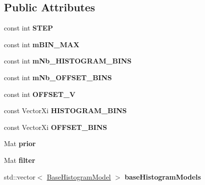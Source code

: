 \subsection*{Public Attributes}
\begin{DoxyCompactItemize}
\item 
\hypertarget{classLaneFilter_ab71c393caf2edf8518576757c5c5c60a}{const int {\bfseries S\-T\-E\-P}}\label{classLaneFilter_ab71c393caf2edf8518576757c5c5c60a}

\item 
\hypertarget{classLaneFilter_a2193e82063749e9aff6f9487d57aaad7}{const int {\bfseries m\-B\-I\-N\-\_\-\-M\-A\-X}}\label{classLaneFilter_a2193e82063749e9aff6f9487d57aaad7}

\item 
\hypertarget{classLaneFilter_a318e84ea645f716c0a66ef83175e8556}{const int {\bfseries m\-Nb\-\_\-\-H\-I\-S\-T\-O\-G\-R\-A\-M\-\_\-\-B\-I\-N\-S}}\label{classLaneFilter_a318e84ea645f716c0a66ef83175e8556}

\item 
\hypertarget{classLaneFilter_a020236f8bcee6881d72a235c111c677f}{const int {\bfseries m\-Nb\-\_\-\-O\-F\-F\-S\-E\-T\-\_\-\-B\-I\-N\-S}}\label{classLaneFilter_a020236f8bcee6881d72a235c111c677f}

\item 
\hypertarget{classLaneFilter_a2dff037db82119c2372d49b5d79ca44e}{const int {\bfseries O\-F\-F\-S\-E\-T\-\_\-\-V}}\label{classLaneFilter_a2dff037db82119c2372d49b5d79ca44e}

\item 
\hypertarget{classLaneFilter_a96434ede64ca9b358416546069ce24b0}{const Vector\-Xi {\bfseries H\-I\-S\-T\-O\-G\-R\-A\-M\-\_\-\-B\-I\-N\-S}}\label{classLaneFilter_a96434ede64ca9b358416546069ce24b0}

\item 
\hypertarget{classLaneFilter_a0cbecdb0c17690f3479ae7bb7a1ed956}{const Vector\-Xi {\bfseries O\-F\-F\-S\-E\-T\-\_\-\-B\-I\-N\-S}}\label{classLaneFilter_a0cbecdb0c17690f3479ae7bb7a1ed956}

\item 
\hypertarget{classLaneFilter_a886dd2f41ef951a1f93227c8ee0b2120}{Mat {\bfseries prior}}\label{classLaneFilter_a886dd2f41ef951a1f93227c8ee0b2120}

\item 
\hypertarget{classLaneFilter_aedbcc4bc3e482a29cdf0ed919d5e0a76}{Mat {\bfseries filter}}\label{classLaneFilter_aedbcc4bc3e482a29cdf0ed919d5e0a76}

\item 
\hypertarget{classLaneFilter_a85aba364e4e6b75313ba9cd450c97fec}{std\-::vector$<$ \hyperlink{structBaseHistogramModel}{Base\-Histogram\-Model} $>$ {\bfseries base\-Histogram\-Models}}\label{classLaneFilter_a85aba364e4e6b75313ba9cd450c97fec}

\end{DoxyCompactItemize}


